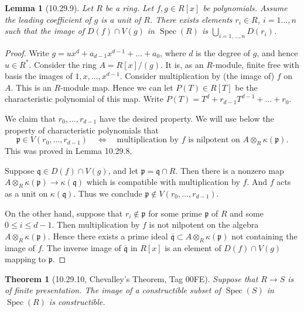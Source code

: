 \documentclass[UTF8,11pt]{ctexart}
\newtheorem*{theorem}{Theorem}
\newtheorem*{lemma}{Lemma}
\theoremstyle{definition}
\DeclareMathOperator{\Spec}{Spec}
\begin{document}
\begin{lemma}[10.29.9]
Let $R$ be a ring. Let $f,g\in R[x]$ be polynomials. Assume the leading coefficient of $g$ is a unit of $R$. There exists elements $r_i\in R$, $i=1\ldots,n$ such that the image of $D(f)\cap V(g)$ in $\Spec(R)$ is $\bigcup_{i=1,\ldots,n}D(r_i)$.
\end{lemma}
\begin{proof}
Write $g=ux^d+a_{d-1}x^{d-1}+\ldots+a_0$, where $d$ is the degree of $g$, and hence $u\in R^*$. Consider the ring $A=R[x]/(g)$. It is, as an $R$-module, finite free with basis the images of $1,x,\ldots,x^{d-1}$. Consider multiplication by (the image of) $f$ on $A$. This is an $R$-module map. Hence we can let $P(T)\in R[T]$ be the characteristic polynomial of this map. Write $P(T)=T^d+r_{d-1}T^{d-1}+\ldots+r_0$.

We claim that $r_0,\ldots,r_{d-1}$ have the desired property. We will use below the property of characteristic polynomials that
\[
\mathfrak p\in V(r_0,\ldots,r_{d-1})\quad\Longleftrightarrow\quad
\text{multiplication by $f$ is nilpotent on }A\otimes_R\kappa(\mathfrak p).
\]
This was proved in Lemma 10.29.8.

Suppose $\mathfrak q\in D(f)\cap V(g)$, and let $\mathfrak p=\mathfrak q\cap R$. Then there is a nonzero map $A\otimes_R\kappa(\mathfrak p)\to\kappa(\mathfrak q)$ which is compatible with multiplication by $f$. And $f$ acts as a unit on $\kappa(\mathfrak q)$. Thus we conclude $\mathfrak p\notin V(r_0,\ldots,r_{d-1})$.

On the other hand, suppose that $r_i\notin\mathfrak p$ for some prime $\mathfrak p$ of $R$ and some $0\leq i\leq d-1$. Then multiplication by $f$ is not nilpotent on the algebra $A\otimes_R\kappa(\mathfrak p)$. Hence there exists a prime ideal $\overline{\mathfrak q}\subset A\otimes_R\kappa(\mathfrak p)$ not containing the image of $f$. The inverse image of $\overline{\mathfrak q}$ in $R[x]$ is an element of $D(f)\cap V(g)$ mapping to $\mathfrak p$.
\end{proof}
\begin{theorem}[10.29.10, Chevalley's Theorem, Tag 00FE]
Suppose that $R\to S$ is of finite presentation. The image of a constructible subset of $\Spec(S)$ in $\Spec(R)$ is constructible.
\end{theorem}
\end{document}
